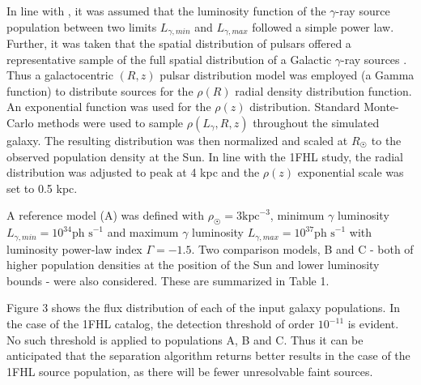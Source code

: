 \documentclass{PoS}
\begin{document}
In line with \cite{Strong}, it was assumed that the luminosity function of the $\gamma$-ray source population between two limits $L_{\gamma, min}$ and $L_{\gamma, max}$ followed a simple power law. Further, it was taken that the spatial distribution of pulsars offered a representative sample of the full spatial distribution of a Galactic $\gamma$-ray sources \cite[p.2]{Strong}. Thus a galactocentric $(R, z)$ pulsar distribution model was employed \cite[p.7]{Lorimer} (a Gamma function) to distribute sources for the $\rho(R)$ radial density distribution function. An exponential function was used for the $\rho(z)$ distribution. Standard Monte-Carlo methods were used to sample $\rho(L_{\gamma}, R, z)$ throughout the simulated galaxy. The resulting distribution was then normalized and scaled at $R_{\astrosun}$ to the observed population density at the Sun. In line with the 1FHL study, the radial distribution was adjusted to peak at 4 kpc and the $\rho(z)$ exponential scale was set to 0.5 kpc.

A reference model (A) was defined with $\rho_{\astrosun} = 3 \text{kpc}^{-3}$, minimum $\gamma$ luminosity $L_{\gamma, min} = 10^{34} \text{ph s}^{-1}$ and maximum $\gamma$ luminosity $L_{\gamma, max} = 10^{37} \text{ph s}^{-1}$ with luminosity power-law index $\Gamma=-1.5$. Two comparison models, B and C - both of higher population densities at the position of the Sun and lower luminosity bounds - were also considered. These are summarized in Table 1.

Figure 3 shows the flux distribution of each of the input galaxy populations. In the case of the 1FHL catalog, the detection threshold of order $10^{-11}$ is evident. No such threshold is applied to populations A, B and C. Thus it can be anticipated that the separation algorithm returns better results in the case of the 1FHL source population, as there will be fewer unresolvable faint sources.

\begin{table}
\centering
{}
\caption{Parameters for 10 - 500 GeV Galaxy Population Simulations.}
\vspace{-20pt}
\end{table}
\end{document}
